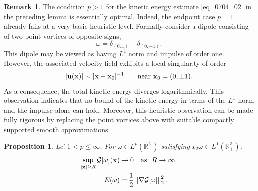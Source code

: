 \documentclass[11pt]{amsart}
\newtheorem{proposition}[theorem]{Proposition}
\theoremstyle{definition}
\theoremstyle{definition}
\newtheorem{remark}[theorem]{Remark}
\numberwithin{equation}{section}
\newcommand{\0}{\emptyset}
\newcommand{\bfu}{{\bf u}}
\newcommand{\bfx}{{\bf x}}
\newcommand{\bbR}{\mathbb R}
\newcommand{\calG}{\mathcal G}
\begin{document}
	\begin{remark}\label{rem_optimality_p}
		The condition $p>1$ for the kinetic energy estimate \eqref{eq_0704_02} in the preceding lemma   
		is essentially optimal.
		Indeed, the endpoint case $p=1$ already fails at a very basic heuristic level.
		Formally consider a dipole consisting of two point vortices of opposite signs,
		\[
		\omega = \delta_{(0,1)} - \delta_{(0,-1)}.
		\]
		This dipole may be viewed as having   $L^1$ norm and   impulse of order one.
		However, the associated velocity field exhibits a local singularity of order
		\[
		|\bfu( \bfx)| \sim |\bfx - \bfx_0|^{-1}
		\qquad \text{near } \bfx_0=(0,\pm 1).
		\]
		As a consequence,   the total kinetic energy diverges logarithmically.		
		This observation indicates that no bound of the kinetic energy in terms of the
		$L^1$-norm and the impulse alone can hold.
		Moreover, this heuristic observation can be made fully rigorous by replacing
		the point vortices above with suitable compactly supported smooth approximations.
	\end{remark}
	
	\begin{proposition}
		\label{lem_stream_bdd}
		Let $1<p\leq \infty$. For $\omega\in L^p(\bbR^2_+)$ satisfying $x_2\omega\in L^1(\bbR^2_+)$,  
		\begin{align}
			\sup_{|\bfx| \ge R}\calG[\omega](\bfx)&\to 0 \quad \text{as } \,\, R\to\infty, \label{eq_vanishing} \\
			E(\omega)&=\frac{1}{2}\left\|\nabla \calG[\omega] \right\|_{2}^{2}.  \label{eq_L2energy}
		\end{align}
	\end{proposition}
	
\end{document}
